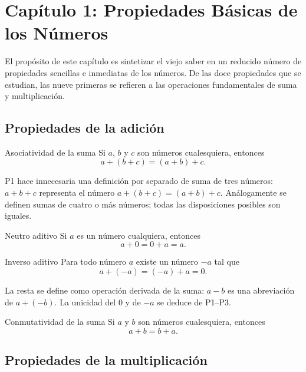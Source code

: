\documentclass[12pt]{article}
\begin{document}
\section{Capítulo 1: Propiedades Básicas de los Números}

El propósito de este capítulo es sintetizar el viejo saber en un reducido número de propiedades sencillas e inmediatas de los números. De las doce propiedades que se estudian, las nueve primeras se refieren a las operaciones fundamentales de suma y multiplicación.

\subsection{Propiedades de la adición}

\begin{axioma}[P1]{Asociatividad de la suma}
Si $a$, $b$ y $c$ son números cualesquiera, entonces
\[ a + (b + c) = (a + b) + c. \]
\end{axioma}

\begin{nota}[]{}
P1 hace innecesaria una definición por separado de suma de tres números: $a + b + c$ representa el número $a + (b+c) = (a+b)+c$. Análogamente se definen sumas de cuatro o más números; todas las disposiciones posibles son iguales.
\end{nota}

\begin{axioma}[P2]{Neutro aditivo}
Si $a$ es un número cualquiera, entonces
\[ a + 0 = 0 + a = a. \]
\end{axioma}

\begin{axioma}[P3]{Inverso aditivo}
Para todo número $a$ existe un número $-a$ tal que
\[ a + (-a) = (-a) + a = 0. \]
\end{axioma}

\begin{nota}[]{}
La resta se define como operación derivada de la suma: $a - b$ es una abreviación de $a + (-b)$. La unicidad del $0$ y de $-a$ se deduce de P1--P3.
\end{nota}

\begin{axioma}[P4]{Conmutatividad de la suma}
Si $a$ y $b$ son números cualesquiera, entonces
\[ a + b = b + a. \]
\end{axioma}

\subsection{Propiedades de la multiplicación}
\end{document}
